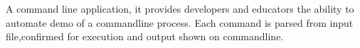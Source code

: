 
A command line application, it provides developers and educators the
ability to automate demo of a commandline process. Each command is
parsed from input file,confirmed for execution and  output shown on
commandline. 
